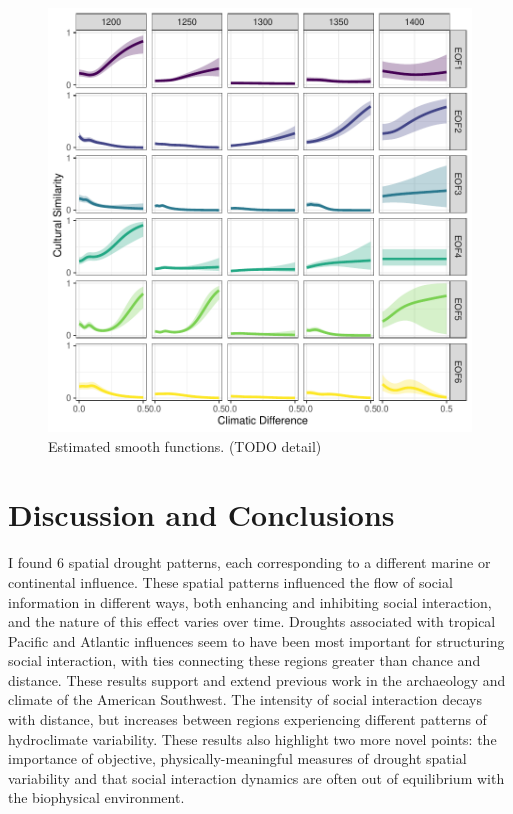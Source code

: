 \documentclass[10pt]{iopart}
\begin{document}
\begin{figure}[!htbp]
\centering
\includegraphics[width=.8\linewidth]{figures/smooths.pdf}
\caption{Estimated smooth functions. (TODO detail)}
\label{fig:smooths}
\end{figure}

\section*{Discussion and Conclusions}
I found 6 spatial drought patterns, each corresponding to a different marine or continental influence. These spatial patterns influenced the flow of social information in different ways, both enhancing and inhibiting social interaction, and the nature of this effect varies over time. Droughts associated with tropical Pacific and Atlantic influences seem to have been most important for structuring social interaction, with ties connecting these regions greater than chance and distance. These results support and extend previous work in the archaeology and climate of the American Southwest. The intensity of social interaction decays with distance, but increases between regions experiencing different patterns of hydroclimate variability. These results also highlight two more novel points: the importance of objective, physically-meaningful measures of drought spatial variability and that social interaction dynamics are often out of equilibrium with the biophysical environment.
\end{document}
